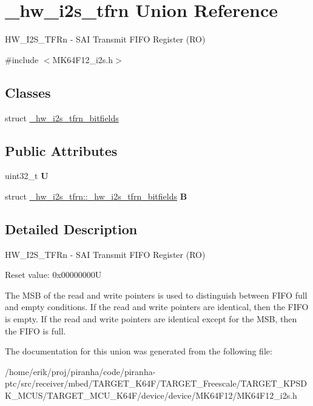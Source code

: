 \hypertarget{union__hw__i2s__tfrn}{}\section{\+\_\+hw\+\_\+i2s\+\_\+tfrn Union Reference}
\label{union__hw__i2s__tfrn}


H\+W\+\_\+\+I2\+S\+\_\+\+T\+F\+Rn -\/ S\+AI Transmit F\+I\+FO Register (RO)  




{\ttfamily \#include $<$M\+K64\+F12\+\_\+i2s.\+h$>$}

\subsection*{Classes}
\begin{DoxyCompactItemize}
\item 
struct \hyperlink{struct__hw__i2s__tfrn_1_1__hw__i2s__tfrn__bitfields}{\+\_\+hw\+\_\+i2s\+\_\+tfrn\+\_\+bitfields}
\end{DoxyCompactItemize}
\subsection*{Public Attributes}
\begin{DoxyCompactItemize}
\item 
uint32\+\_\+t {\bfseries U}\hypertarget{union__hw__i2s__tfrn_a5640c64f272126ff11c1a732cd55a518}{}\label{union__hw__i2s__tfrn_a5640c64f272126ff11c1a732cd55a518}

\item 
struct \hyperlink{struct__hw__i2s__tfrn_1_1__hw__i2s__tfrn__bitfields}{\+\_\+hw\+\_\+i2s\+\_\+tfrn\+::\+\_\+hw\+\_\+i2s\+\_\+tfrn\+\_\+bitfields} {\bfseries B}\hypertarget{union__hw__i2s__tfrn_a2a394561738ad048aa9e820afb146d05}{}\label{union__hw__i2s__tfrn_a2a394561738ad048aa9e820afb146d05}

\end{DoxyCompactItemize}


\subsection{Detailed Description}
H\+W\+\_\+\+I2\+S\+\_\+\+T\+F\+Rn -\/ S\+AI Transmit F\+I\+FO Register (RO) 

Reset value\+: 0x00000000U

The M\+SB of the read and write pointers is used to distinguish between F\+I\+FO full and empty conditions. If the read and write pointers are identical, then the F\+I\+FO is empty. If the read and write pointers are identical except for the M\+SB, then the F\+I\+FO is full. 

The documentation for this union was generated from the following file\+:\begin{DoxyCompactItemize}
\item 
/home/erik/proj/piranha/code/piranha-\/ptc/src/receiver/mbed/\+T\+A\+R\+G\+E\+T\+\_\+\+K64\+F/\+T\+A\+R\+G\+E\+T\+\_\+\+Freescale/\+T\+A\+R\+G\+E\+T\+\_\+\+K\+P\+S\+D\+K\+\_\+\+M\+C\+U\+S/\+T\+A\+R\+G\+E\+T\+\_\+\+M\+C\+U\+\_\+\+K64\+F/device/device/\+M\+K64\+F12/M\+K64\+F12\+\_\+i2s.\+h\end{DoxyCompactItemize}
